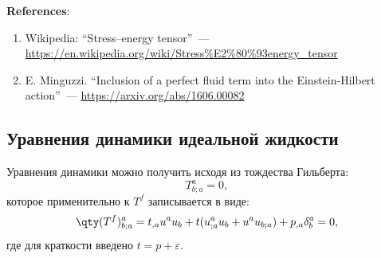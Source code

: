 \documentclass[\docroot/reports/draft/report.tex]{subfiles}
\begin{document}
    \vspace{1cm}

    \textbf{\Large{References}}:
    \begin{enumerate}
        \item Wikipedia: \enquote{Stress–energy tensor}~--- \url{https://en.wikipedia.org/wiki/Stress%E2%80%93energy_tensor}
        \item E. Minguzzi. \enquote{Inclusion of a perfect fluid term into the Einstein-Hilbert action}~--- \url{https://arxiv.org/abs/1606.00082}
    \end{enumerate}

\subsection{Уравнения динамики идеальной жидкости}

    Уравнения динамики можно получить исходя из тождества Гильберта:
    \begin{equation}
        T^a_{b;a} = 0 ,
    \end{equation}
    которое применительно к $T^f$ записывается в виде:
    \begin{equation*}
        \qty(T^f)^a_{b;a} = t_{,a} u^a u_b + t (u^a_{;a} u_b + u^a u_{b;a}) + p_{,a} \delta^a_b = 0,
    \end{equation*}
    где для краткости введено $t = p + \varepsilon$.
\end{document}

